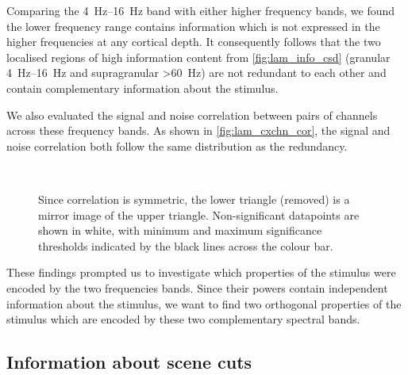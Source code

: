 Comparing the \SIrange{4}{16}{Hz} band with either higher frequency bands, we found the lower frequency range contains information which is not expressed in the higher frequencies at any cortical depth.
It consequently follows that the two localised regions of high information content from \autoref{fig:lam_info_csd} (granular \SIrange{4}{16}{Hz} and supragranular \SI{>60}{Hz}) are not redundant to each other and contain complementary information about the stimulus.

We also evaluated the signal and noise correlation between pairs of channels across these frequency bands.
As shown in \autoref{fig:lam_cxchn_cor}, the signal and noise correlation both follow the same distribution as the redundancy.

\begin{figure}[htbp]
    \centering
    \hspace*{\fill}
    \hspace*{\fill}
    \\
    \hspace*{\fill}
    \hspace*{\fill}
%
\caption{
Since correlation is symmetric, the lower triangle (removed) is a mirror image of the upper triangle.
Non-significant datapoints are shown in white, with minimum and maximum significance thresholds indicated by the black lines across the colour bar.
}%
\label{fig:lam_cxchn_cor}
%
\end{figure}

These findings prompted us to investigate which properties of the stimulus were encoded by the two frequencies bands.
Since their powers contain independent information about the stimulus, we want to find two orthogonal properties of the stimulus which are encoded by these two complementary spectral bands.


\subsection{Information about scene cuts}
\label{sec:lam_scnchg}


